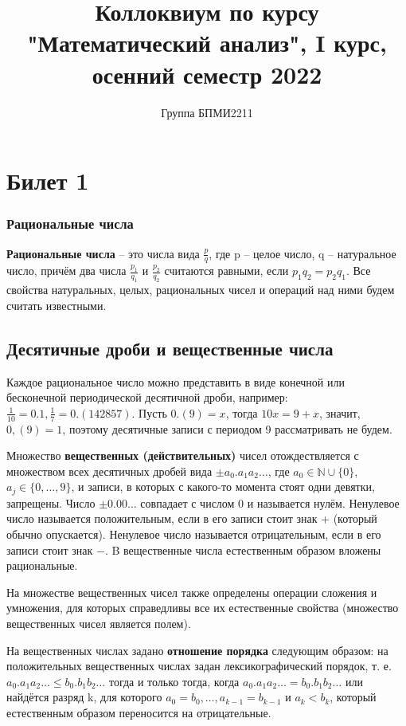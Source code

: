 \documentclass[12pt]{article}
\title{Коллоквиум по курсу "Математический анализ", I курс, осенний семестр 2022}
\author{Группа БПМИ2211}
\theoremstyle{definition}
\begin{document}
\maketitle

\section{Билет 1}
\subsubsection*{Рациональные числа}
\textbf{Рациональные числа} – это числа вида $\frac{p}{q}$, где p – целое число, q – натуральное число, причём два числа $\frac{p_1}{q_1}$  и $\frac{p_2}{q_2}$  считаются равными, если $p_1q_2=p_2q_1$. Все свойства натуральных, целых, рациональных чисел и операций над ними будем считать известными.

\subsection*{Десятичные дроби и вещественные числа}

Каждое рациональное число можно представить в виде конечной или бесконечной периодической десятичной дроби, например: $\frac{1}{10}=0.1,   \frac{1}{7}=0.(142857)$. Пусть $0.(9)=x$, тогда $10x=9+x$, значит, $0,(9)=1$, поэтому десятичные записи с периодом 9 рассматривать не будем.

Множество \textbf{вещественных (действительных)} чисел отождествляется с множеством всех десятичных дробей вида $ \pm a_0.a_1 a_2\ldots$,  где $a_0 \in \mathbb {N} \cup \{0\}$, $a_j \in \{0,…,9\}$, и записи, в которых с какого-то момента стоят одни девятки, запрещены. Число $\pm 0.00\ldots$ совпадает с числом 0 и называется нулём. Ненулевое число называется положительным, если в его записи стоит знак + (который обычно опускается). Ненулевое число называется отрицательным, если в его записи стоит знак $-$. B вещественные числа естественным образом вложены рациональные.

На множестве вещественных чисел также определены операции сложения и умножения, для которых справедливы все их естественные свойства (множество вещественных чисел является полем).

На вещественных числах задано \textbf{отношение порядка} следующим образом: на положительных вещественных числах задан лексикографический порядок, т. е. $a_0.a_1a_2\ldots\leq b_0.b_1 b_2\ldots$ тогда и только тогда, когда $a_0.a_1 a_2 \ldots = b_0.b_1 b_2 \ldots $ или найдётся разряд k, для которого $a_0=b_0,\ldots,a_{k-1}=b_{k-1}$ и $a_k<b_k$, который естественным образом переносится на отрицательные.
\end{document}
